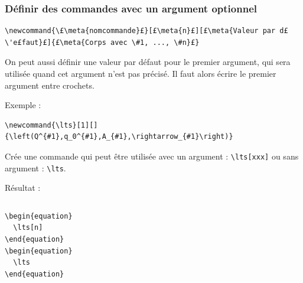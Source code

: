 \documentclass{beamer}
\newcommand{\lts}[1][]{\ensuremath\left(Q^{#1}, q_0^{#1}, A_{#1}, \rightarrow_{#1}\right)}
\begin{document}
\begin{frame}[fragile]
  \frametitle{Définir des commandes avec un argument optionnel}

\begin{lstlisting}
\newcommand{\£\meta{nomcommande}£}[£\meta{n}£][£\meta{Valeur par d£\'e£faut}£]{£\meta{Corps avec \#1, ..., \#n}£}
\end{lstlisting}
On peut aussi définir une valeur par défaut pour le premier argument, qui sera utilisée quand cet argument n'est pas précisé.
Il faut alors écrire le premier argument entre crochets.

\bigskip
Exemple :
\begin{lstlisting}
\newcommand{\lts}[1][]{\left(Q^{#1},q_0^{#1},A_{#1},\rightarrow_{#1}\right)}
\end{lstlisting}
Crée une commande qui peut être utilisée avec un argument : \lstinline?\lts[xxx]?
ou sans argument : \lstinline?\lts?.

\bigskip
Résultat :
\begin{columns}
\begin{column}{.45\textwidth}
\begin{lstlisting}
\begin{equation}
  \lts[n]
\end{equation}
\begin{equation}
  \lts
\end{equation}
\end{lstlisting}
\end{column}

\begin{column}{.45\textwidth}
\myex{%
\begin{equation}
  \lts[n]
\end{equation}
\begin{equation}
  \lts
\end{equation}
}
\end{column}
\end{columns}

\end{frame}
\end{document}
